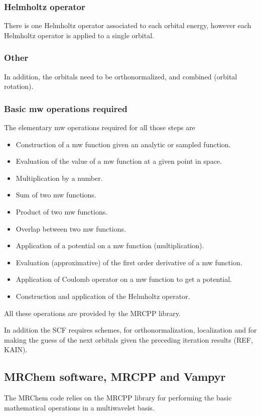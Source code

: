 \documentclass{article}
\begin{document}
\subsubsection{Helmholtz operator}

There is one Helmholtz operator associated to each orbital energy, however each Helmholtz operator is applied to a single orbital.

\subsubsection{Other}
In addition, the orbitals need to be orthonormalized, and combined (orbital rotation).

\subsubsection{Basic mw operations required}

The elementary mw operations required for all those steps are
\begin{itemize}
\item Construction of a mw function given an analytic or sampled function.
\item Evaluation of the value of a mw function at a given point in space.
\item Multiplication by a number.
\item Sum of two mw functions.
\item Product of two mw functions.
\item Overlap between two mw functions.
\item Application of a potential on a mw function (multiplication).
\item Evaluation (approximative) of the first order derivative of a mw function.
\item Application of Coulomb operator on a mw function to get a potential.
\item Construction and application of the Helmholtz operator.
\end{itemize}
All these operations are provided by the MRCPP library.

In addition the SCF requires schemes, for orthonormalization, localization and for making the guess of the next orbitals given the preceding iteration results (REF, KAIN).

\subsection{MRChem software, MRCPP and Vampyr}
The MRChem code relies on the MRCPP library for performing the basic mathematical operations in a multiwavelet basis.
\end{document}
